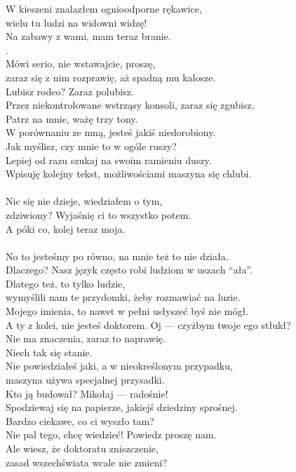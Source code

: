 \chardok{}
W kieszeni znalazłem ognioodporne rękawice,\\
wielu tu ludzi na widowni widzę!\\
Na zabawy z wami, mam teraz branie.\\
.\\

\charfer{}
Mówi serio, nie wstawajcie, proszę,\\
zaraz się z nim rozprawię, aż spadną mu kalosze.\\
Lubisz rodeo? Zaraz polubisz.\\
Przez niekontrolowane wstrząsy konsoli, zaraz się zgubisz.\\
Patrz na mnie, ważę trzy tony.\\
W porównaniu ze mną, jesteś jakiś niedorobiony.\\
Jak myślisz, czy mnie to w ogóle ruszy?\\
Lepiej od razu szukaj na swoim ramieniu duszy.\\
Wpisuję kolejny tekst, możliwościami maszyna się chlubi.\\
\\

\chardok{}
Nic się nie dzieje, wiedziałem o tym,\\
zdziwiony? Wyjaśnię ci to wszystko potem.\\
A póki co, kolej teraz moja.\\
\\

\charfer{}
No to jesteśmy po równo, na mnie też to nie działa.\\
Dlaczego? Nasz język często robi ludziom w uszach "`ała"'.\\
Dlatego też, to tylko ludzie,\\
wymyślili nam te przydomki, żeby rozmawiać na luzie.\\
Mojego imienia, to nawet w pełni usłyszeć byś nie mógł.\\
A ty z kolei, nie jesteś doktorem. Oj --- czyżbym twoje ego stłukł?\\

\chardok{}
Nie ma znaczenia, zaraz to naprawię.\\
 Niech tak się stanie.\\

\charfer{}
Nie powiedziałeś jaki, a w nieokreślonym przypadku,\\
maszyna używa specjalnej przysadki.\\
Kto ją budował? Mikołaj --- radośnie!\\
Spodziewaj się na papierze, jakiejś dziedziny sprośnej.\\
Bardzo ciekawe, co ci wyszło tam?\\
Nie pal tego, chcę wiedzieć! Powiedz proszę nam.\\
Ale wiesz, że doktoratu zniszczenie,\\
zasad wszechświata wcale nie zmieni?\\

